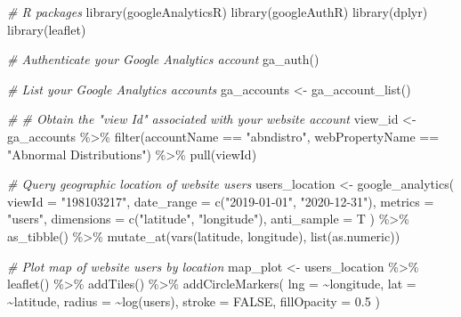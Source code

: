 \documentclass[
]{book}
\newenvironment{Shaded}{\begin{snugshade}}{\end{snugshade}}
\newcommand{\AttributeTok}[1]{\textcolor[rgb]{0.77,0.63,0.00}{#1}}
\newcommand{\CommentTok}[1]{\textcolor[rgb]{0.56,0.35,0.01}{\textit{#1}}}
\newcommand{\ConstantTok}[1]{\textcolor[rgb]{0.00,0.00,0.00}{#1}}
\newcommand{\FloatTok}[1]{\textcolor[rgb]{0.00,0.00,0.81}{#1}}
\newcommand{\FunctionTok}[1]{\textcolor[rgb]{0.00,0.00,0.00}{#1}}
\newcommand{\NormalTok}[1]{#1}
\newcommand{\OtherTok}[1]{\textcolor[rgb]{0.56,0.35,0.01}{#1}}
\newcommand{\SpecialCharTok}[1]{\textcolor[rgb]{0.00,0.00,0.00}{#1}}
\newcommand{\StringTok}[1]{\textcolor[rgb]{0.31,0.60,0.02}{#1}}
\begin{document}
\begin{Shaded}
\begin{Highlighting}[]
\CommentTok{\# R packages}
\FunctionTok{library}\NormalTok{(googleAnalyticsR)}
\FunctionTok{library}\NormalTok{(googleAuthR)}
\FunctionTok{library}\NormalTok{(dplyr)}
\FunctionTok{library}\NormalTok{(leaflet)}

\CommentTok{\# Authenticate your Google Analytics account}
\FunctionTok{ga\_auth}\NormalTok{()}

\CommentTok{\# List your Google Analytics accounts}
\NormalTok{ga\_accounts }\OtherTok{\textless{}{-}} \FunctionTok{ga\_account\_list}\NormalTok{()}

\CommentTok{\# \# Obtain the "view Id" associated with your website account}
\NormalTok{view\_id }\OtherTok{\textless{}{-}}\NormalTok{ ga\_accounts }\SpecialCharTok{\%\textgreater{}\%}
  \FunctionTok{filter}\NormalTok{(accountName }\SpecialCharTok{==} \StringTok{"abndistro"}\NormalTok{, webPropertyName }\SpecialCharTok{==} \StringTok{"Abnormal Distributions"}\NormalTok{) }\SpecialCharTok{\%\textgreater{}\%}
  \FunctionTok{pull}\NormalTok{(viewId)}

\CommentTok{\# Query geographic location of website users}
\NormalTok{users\_location }\OtherTok{\textless{}{-}} \FunctionTok{google\_analytics}\NormalTok{(}
  \AttributeTok{viewId =} \StringTok{"198103217"}\NormalTok{,}
  \AttributeTok{date\_range =} \FunctionTok{c}\NormalTok{(}\StringTok{"2019{-}01{-}01"}\NormalTok{, }\StringTok{"2020{-}12{-}31"}\NormalTok{),}
  \AttributeTok{metrics =} \StringTok{"users"}\NormalTok{,}
  \AttributeTok{dimensions =} \FunctionTok{c}\NormalTok{(}\StringTok{"latitude"}\NormalTok{, }\StringTok{"longitude"}\NormalTok{),}
  \AttributeTok{anti\_sample =}\NormalTok{ T}
\NormalTok{) }\SpecialCharTok{\%\textgreater{}\%}
  \FunctionTok{as\_tibble}\NormalTok{() }\SpecialCharTok{\%\textgreater{}\%}
  \FunctionTok{mutate\_at}\NormalTok{(}\FunctionTok{vars}\NormalTok{(latitude, longitude), }\FunctionTok{list}\NormalTok{(as.numeric))}

\CommentTok{\# Plot map of website users by location}
\NormalTok{map\_plot }\OtherTok{\textless{}{-}}\NormalTok{ users\_location }\SpecialCharTok{\%\textgreater{}\%}
  \FunctionTok{leaflet}\NormalTok{() }\SpecialCharTok{\%\textgreater{}\%}
  \FunctionTok{addTiles}\NormalTok{() }\SpecialCharTok{\%\textgreater{}\%}
  \FunctionTok{addCircleMarkers}\NormalTok{(}
    \AttributeTok{lng =} \SpecialCharTok{\textasciitilde{}}\NormalTok{longitude,}
    \AttributeTok{lat =} \SpecialCharTok{\textasciitilde{}}\NormalTok{latitude,}
    \AttributeTok{radius =} \SpecialCharTok{\textasciitilde{}}\FunctionTok{log}\NormalTok{(users),}
    \AttributeTok{stroke =} \ConstantTok{FALSE}\NormalTok{,}
    \AttributeTok{fillOpacity =} \FloatTok{0.5}
\NormalTok{ )}
\end{Highlighting}
\end{Shaded}
\end{document}
